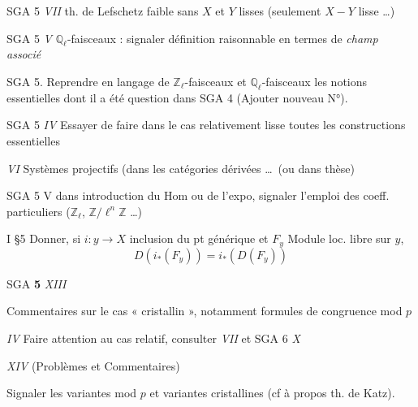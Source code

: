 \documentclass[11pt,a4paper]{article}
\begin{document}
SGA 5 \emph{VII} \quad th. de Lefschetz faible sans  $X$
et $Y$ lisses (seulement $X - Y$ lisse \ldots)

SGA 5 \emph{V} \quad $\mathbb{Q}_\ell$-faisceaux : signaler
définition raisonnable en termes de \emph{champ associé}

SGA 5. \struck{\ill{}}  \quad Reprendre en langage de
$\mathbb{Z}_\ell$-faisceaux et $\mathbb{Q}_\ell$-faisceaux les notions
essentielles dont il a été question dans SGA 4 (Ajouter nouveau N°).

SGA 5 \emph{IV} \quad Essayer de faire dans le cas relativement lisse toutes
les constructions essentielles


\emph{VI} \quad Systèmes projectifs  (dans les catégories
dérivées \ldots\ (ou dans thèse)

SGA 5 V \quad dans introduction du Hom ou de l'expo, signaler l'emploi
des coeff.  particuliers ($\mathbb{Z}_\ell$, $\mathbb{Z}/\ell^n
\mathbb{Z}$ \ldots)


I §5 \quad Donner, si $i : y \to X$ inclusion du pt générique et $F_y$ Module loc.
libre sur $y$,
\[
D(i_*(F_y)) = i_*(D(F_y))
\]



SGA \textbf{5} \quad \emph{XIII}

Commentaires sur le cas « cristallin », notamment formules de congruence mod $p$

\struck{\ill{}} \emph{IV} \quad Faire attention au cas relatif, consulter
\emph{VII} et SGA 6 \emph{X}

\emph{XIV} (Problèmes et Commentaires)

Signaler les variantes mod $p$ et variantes cristallines (cf  à propos th. de Katz).
\end{document}
